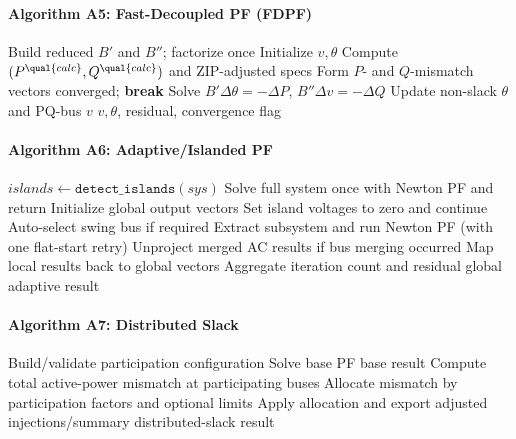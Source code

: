 \paragraph{Algorithm A5: Fast-Decoupled PF (FDPF)}
\begin{algorithmic}[1]
  \State Build reduced \(B'\) and \(B''\); factorize once
  \State Initialize \(v,\theta\)
    \State Compute \((P^{\qual{calc}},Q^{\qual{calc}})\) and ZIP-adjusted specs
    \State Form \(P\)- and \(Q\)-mismatch vectors
     \State converged; \textbf{break} \EndIf
    \State Solve \(B' \Delta\theta = -\Delta P\), \(B''\Delta v = -\Delta Q\)
    \State Update non-slack \(\theta\) and PQ-bus \(v\)
  \EndFor
  \State \Return \(v,\theta\), residual, convergence flag
\EndProcedure
\end{algorithmic}

\paragraph{Algorithm A6: Adaptive/Islanded PF}
\begin{algorithmic}[1]
  \State $islands \gets \texttt{detect\_islands}(sys)$
    \State Solve full system once with Newton PF and return
  \EndIf
  \State Initialize global output vectors
      \State Set island voltages to zero and continue
    \EndIf
    \State Auto-select swing bus if required
    \State Extract subsystem and run Newton PF (with one flat-start retry)
    \State Unproject merged AC results if bus merging occurred
    \State Map local results back to global vectors
  \EndFor
  \State Aggregate iteration count and residual
  \State \Return global adaptive result
\EndProcedure
\end{algorithmic}

\paragraph{Algorithm A7: Distributed Slack}
\begin{algorithmic}[1]
  \State Build/validate participation configuration
  \State Solve base PF
   \State \Return base result \EndIf
  \State Compute total active-power mismatch at participating buses
  \State Allocate mismatch by participation factors and optional limits
  \State Apply allocation and export adjusted injections/summary
  \State \Return distributed-slack result
\EndProcedure
\end{algorithmic}

